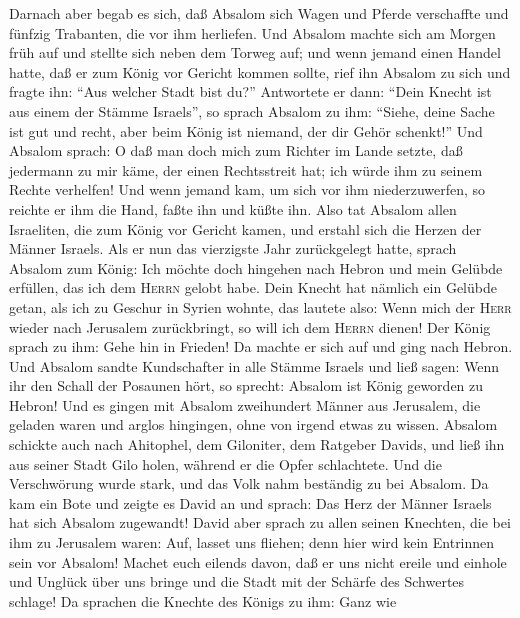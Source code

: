  Darnach aber begab es sich, daß Absalom sich Wagen und
Pferde verschaffte und fünfzig Trabanten, die vor ihm herliefen.
 Und Absalom machte sich am Morgen früh auf und stellte
sich neben dem Torweg auf; und wenn jemand einen Handel hatte, daß er
zum König vor Gericht kommen sollte, rief ihn Absalom zu sich und fragte
ihn: ``Aus welcher Stadt bist du?'' Antwortete er dann: ``Dein Knecht
ist aus einem der Stämme Israels'',  so sprach Absalom zu
ihm: ``Siehe, deine Sache ist gut und recht, aber beim König ist
niemand, der dir Gehör schenkt!''  Und Absalom sprach: O
daß man doch mich zum Richter im Lande setzte, daß jedermann zu mir
käme, der einen Rechtsstreit hat; ich würde ihm zu seinem Rechte
verhelfen!  Und wenn jemand kam, um sich vor ihm
niederzuwerfen, so reichte er ihm die Hand, faßte ihn und küßte ihn.
 Also tat Absalom allen Israeliten, die zum König vor
Gericht kamen, und erstahl sich die Herzen der Männer Israels.
 Als er nun das vierzigste Jahr zurückgelegt hatte, sprach
Absalom zum König: Ich möchte doch hingehen nach Hebron und mein Gelübde
erfüllen, das ich dem \textsc{Herrn} gelobt habe.  Dein
Knecht hat nämlich ein Gelübde getan, als ich zu Geschur in Syrien
wohnte, das lautete also: Wenn mich der \textsc{Herr} wieder nach
Jerusalem zurückbringt, so will ich dem \textsc{Herrn} dienen!
 Der König sprach zu ihm: Gehe hin in Frieden! Da machte
er sich auf und ging nach Hebron.  Und Absalom sandte
Kundschafter in alle Stämme Israels und ließ sagen: Wenn ihr den Schall
der Posaunen hört, so sprecht: Absalom ist König geworden zu Hebron!
 Und es gingen mit Absalom zweihundert Männer aus
Jerusalem, die geladen waren und arglos hingingen, ohne von irgend etwas
zu wissen.  Absalom schickte auch nach Ahitophel, dem
Giloniter, dem Ratgeber Davids, und ließ ihn aus seiner Stadt Gilo
holen, während er die Opfer schlachtete. Und die Verschwörung wurde
stark, und das Volk nahm beständig zu bei Absalom.  Da
kam ein Bote und zeigte es David an und sprach: Das Herz der Männer
Israels hat sich Absalom zugewandt!  David aber sprach zu
allen seinen Knechten, die bei ihm zu Jerusalem waren: Auf, lasset uns
fliehen; denn hier wird kein Entrinnen sein vor Absalom! Machet euch
eilends davon, daß er uns nicht ereile und einhole und Unglück über uns
bringe und die Stadt mit der Schärfe des Schwertes schlage!
 Da sprachen die Knechte des Königs zu ihm: Ganz wie

